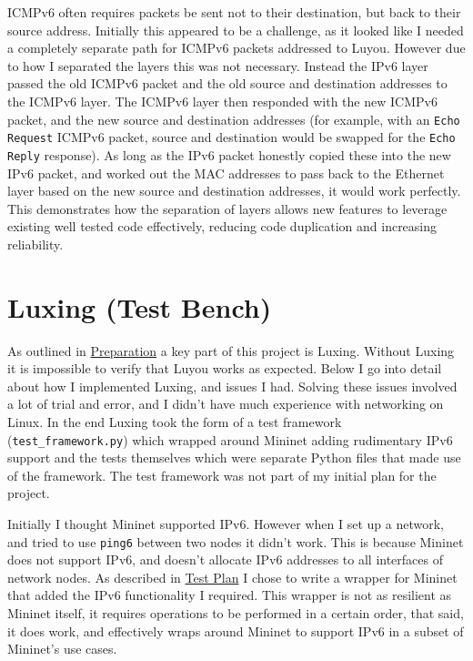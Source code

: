 \documentclass[12pt,a4paper,twoside,openright]{report}
\begin{document}
ICMPv6 often requires packets be sent not to their destination, but back to their source address.  Initially this appeared to be a challenge, as it looked like I needed a completely separate path for ICMPv6 packets addressed to Luyou. However due to how I separated the layers this was not necessary. Instead the IPv6 layer passed the old ICMPv6 packet and the old source and destination addresses to the ICMPv6 layer. The ICMPv6 layer then responded with the new ICMPv6 packet, and the new source and destination addresses (for example, with an \verb!Echo Request! ICMPv6 packet, source and destination would be swapped for the \verb!Echo Reply! response).  As long as the IPv6 packet honestly copied these into the new IPv6 packet, and worked out the MAC addresses to pass back to the Ethernet layer based on the new source and destination addresses, it would work perfectly. This demonstrates how the separation of layers allows new features to leverage existing well tested code effectively, reducing code duplication and increasing reliability.

\section{Luxing (Test Bench)}

As outlined in \hyperref[chap::preparation]{Preparation} a key part of this project is Luxing. Without Luxing it is impossible to verify that Luyou works as expected.  Below I go into detail about how I implemented Luxing, and issues I had.  Solving these issues involved a lot of trial and error, and I didn't have much experience with networking on Linux.  In the end Luxing took the form of a test framework (\verb!test_framework.py!) which wrapped around Mininet adding rudimentary IPv6 support and the tests themselves which were separate Python files that made use of the framework. The test framework was not part of my initial plan for the project.

\bigskip

Initially I thought Mininet\cite{mininet} supported IPv6.  However when I set up a network, and tried to use \verb!ping6! between two nodes it didn't work.  This is because Mininet does not support IPv6, and doesn't allocate IPv6 addresses to all interfaces of network nodes.  As described in \hyperref[sec::test_plan]{Test Plan} I chose to write a wrapper for Mininet that added the IPv6 functionality I required.  This wrapper is not as resilient as Mininet itself, it requires operations to be performed in a certain order, that said, it does work, and effectively wraps around Mininet to support IPv6 in a subset of Mininet's use cases.
\end{document}
